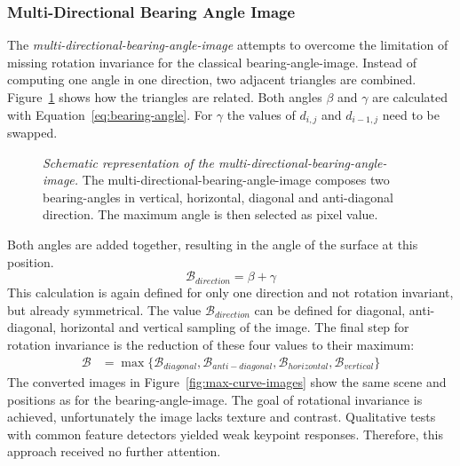 \subsubsection{Multi-Directional Bearing Angle Image}

The \emph{\gls{multi-directional-bearing-angle-image}} attempts to overcome the limitation of missing rotation invariance for the classical \gls{bearing-angle-image}.
Instead of computing one angle in one direction, two adjacent triangles are combined.
Figure~\ref{fig:max-curve} shows how the triangles are related.
Both angles $\beta$ and $\gamma$ are calculated with Equation~\ref{eq:bearing-angle}.
For $\gamma$ the values of $d_{i,j}$ and $d_{i-1,j}$ need to be swapped.
\begin{figure}
    \scalebox{0.9}{%
    
    }
    \caption[Schematic representation of the \gls{multi-directional-bearing-angle-image}]{\emph{Schematic representation of the \gls{multi-directional-bearing-angle-image}.} The \gls{multi-directional-bearing-angle-image} composes two \Glspl{bearing-angle} in vertical, horizontal, diagonal and anti-diagonal direction. The maximum angle is then selected as pixel value.}\label{fig:max-curve}
\end{figure}
Both angles are added together, resulting in the angle of the surface at this position.
\begin{equation}
    \mathcal{B_{\textit{direction}}}= \beta + \gamma
\end{equation}
This calculation is again defined for only one direction and not rotation invariant, but already symmetrical.
The value $\mathcal{B_{\textit{direction}}}$ can be defined for diagonal, anti-diagonal, horizontal and vertical sampling of the image.
The final step for rotation invariance is the reduction of these four values to their maximum:
\vspace{-2mm}
\begin{align}
    \mathcal{B} &= \max{\{\mathcal{B}_{diagonal}, \mathcal{B}_{anti-diagonal}, \mathcal{B}_{horizontal}, \mathcal{B}_{vertical}\}}
\end{align}
The converted images in Figure~\ref{fig:max-curve-images} show the same scene and positions as for the \gls{bearing-angle-image}.
The goal of rotational invariance is achieved, unfortunately the image lacks texture and contrast.
Qualitative tests with common feature detectors yielded weak keypoint responses.
Therefore, this approach received no further attention.
